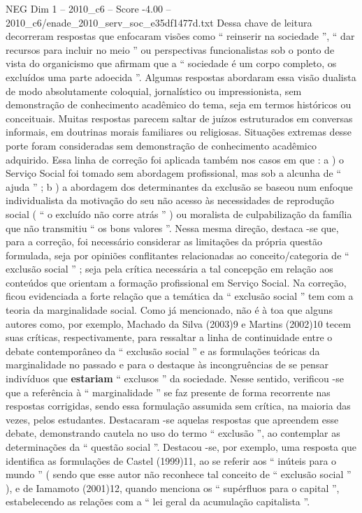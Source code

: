 \begin{textsample}{NEG Dim 1 – 2010\_c6 – Score -4.00 – 2010\_c6/enade\_2010\_serv\_soc\_e35df1477d.txt}
Dessa chave de leitura decorreram respostas que enfocaram visões como “ reinserir na sociedade ”, “ dar recursos para incluir no meio ” ou perspectivas funcionalistas sob o ponto de vista do organicismo que afirmam que a “ sociedade é um corpo completo, os excluídos uma parte adoecida ”.
Algumas respostas abordaram essa visão dualista de modo absolutamente coloquial, jornalístico ou impressionista, sem demonstração de conhecimento acadêmico do tema, seja em termos históricos ou conceituais.
Muitas respostas parecem saltar de juízos estruturados em conversas informais, em doutrinas morais familiares ou religiosas.
Situações extremas desse porte foram consideradas sem demonstração de conhecimento acadêmico adquirido.
Essa linha de correção foi aplicada também nos casos em que : a ) o Serviço Social foi tomado sem abordagem profissional, mas sob a alcunha de “ ajuda ” ; b ) a abordagem dos determinantes da exclusão se baseou num enfoque individualista da motivação do seu não acesso às necessidades de reprodução social ( “ o excluído não corre atrás ” ) ou moralista de culpabilização da família que não transmitiu “ os bons valores ”.
Nessa mesma direção, destaca -se que, para a correção, foi necessário considerar as limitações da própria questão formulada, seja por opiniões conflitantes relacionadas ao conceito/categoria de “ exclusão social ” ; seja pela crítica necessária a tal concepção em relação aos conteúdos que orientam a formação profissional em Serviço Social.
Na correção, ficou evidenciada a forte relação que a temática da “ exclusão social ” tem com a teoria da marginalidade social.
Como já mencionado, não é à toa que alguns autores como, por exemplo, Machado da Silva (2003)9 e Martins (2002)10 tecem suas críticas, respectivamente, para ressaltar a linha de continuidade entre o debate contemporâneo da “ exclusão social ” e as formulações teóricas da marginalidade no passado e para o destaque às incongruências de se pensar indivíduos que \textbf{estariam} “ exclusos ” da sociedade.
Nesse sentido, verificou -se que a referência à “ marginalidade ” se faz presente de forma recorrente nas respostas corrigidas, sendo essa formulação assumida sem crítica, na maioria das vezes, pelos estudantes.
Destacaram -se aquelas respostas que apreendem esse debate, demonstrando cautela no uso do termo “ exclusão ”, ao contemplar as determinações da “ questão social ”.
Destacou -se, por exemplo, uma resposta que identifica as formulações de Castel (1999)11, ao se referir aos “ inúteis para o mundo ” ( sendo que esse autor não reconhece tal conceito de “ exclusão social ” ), e de Iamamoto (2001)12, quando menciona os “ supérfluos para o capital ”, estabelecendo as relações com a “ lei geral da acumulação capitalista ”.

\end{textsample}
